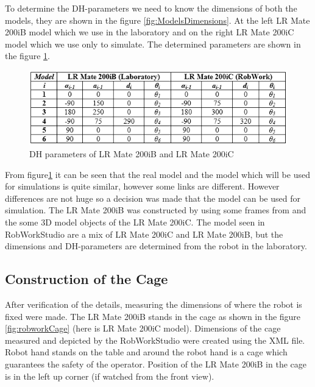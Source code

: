 To determine the DH-parameters we need to know the dimensions of both the models, they are shown in the figure \ref{fig:ModelsDimensions}. At the left LR Mate 200iB model which we use in the laboratory and on the right LR Mate 200iC model which we use only to simulate. The determined parameters are shown in the figure \ref{fig:tableParameters}. 

\begin{figure}[H]
  \centering
  \includegraphics[scale= 0.8]{source/table2.png}
  \caption{DH parameters of LR Mate 200iB and LR Mate 200iC}
  \label{fig:tableParameters}
\end{figure}

From figure\ref{fig:tableParameters} it can be seen that the real model and the model which will be used for simulations is quite similar, however some links are different. However differences are not huge so a decision was made that the model can be used for simulation. The LR Mate 200iB was constructed by using some frames from and the some 3D model objects of the LR Mate 200iC. The model seen in RobWorkStudio are a mix of LR Mate 200iC and LR Mate 200iB, but the dimensions and DH-parameters are determined from the robot in the laboratory.

\subsection{Construction of the Cage}
After verification of the details, measuring the dimensions of where the robot is fixed were made. The LR Mate 200iB stands in the cage as shown in the figure \ref{fig:robworkCage} (here is LR Mate 200iC model). Dimensions of the cage measured and depicted by the RobWorkStudio were created using the XML file. Robot hand stands on the table and around the robot hand is a cage which guarantees the safety of the operator. Position of the LR Mate 200iB in the cage is in the left up corner (if watched from the front view).


